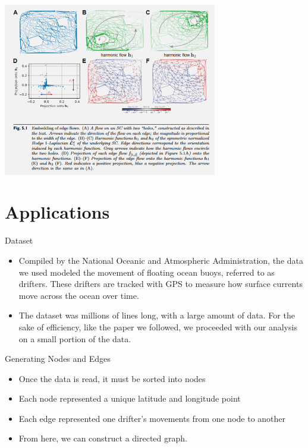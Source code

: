 \documentclass[aspectratio=169,xcolor=dvipsnames]{beamer}
\begin{document}
\begin{frame}
    \begin{center}
        \includegraphics[width=0.7\textwidth]{edge_flows.png}
    \end{center}
\end{frame}


\section{Applications}

\begin{frame}{Dataset}
\begin{itemize}
    \item Compiled by the National Oceanic and Atmospheric Administration, the data we used modeled the movement of floating ocean buoys, referred to as drifters. These drifters are tracked with GPS to measure how surface currents move across the ocean over time.
    \item The dataset was millions of lines long, with a large amount of data. For the sake of efficiency, like the paper we followed, we proceeded with our analysis on a small portion of the data.
\end{itemize}
\end{frame}

\begin{frame}{Generating Nodes and Edges}
    \begin{itemize}
        \item Once the data is read, it must be sorted into nodes
        \item Each node represented a unique latitude and longitude point
        \item Each edge represented one drifter's movements from one node to another
        \item From here, we can construct a directed graph.
    \end{itemize}
\end{frame}
\end{document}
